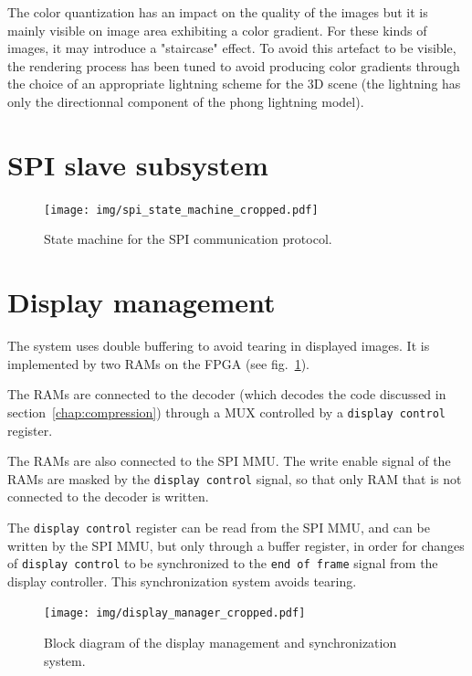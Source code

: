 \documentclass[english, DIV=13]{scrartcl}
\begin{document}
The color quantization has an impact on the quality of the images
but it is mainly visible on image area exhibiting a color gradient.
For these kinds of images,
it may introduce a "staircase" effect. To avoid this artefact to be visible,
the rendering process has been tuned to avoid producing color gradients
through the choice of an appropriate lightning scheme for the 3D scene (the lightning
has only the directionnal component of the phong lightning model).

\section{SPI slave subsystem}
\label{sec:spi}

\begin{figure}
    \centering
    \texttt{[image: img/spi\_state\_machine\_cropped.pdf]}
    \caption{State machine for the SPI communication protocol.}
\end{figure}

\section{Display management}
\label{sec:display-mngt}

The system uses double buffering to avoid tearing in displayed images.
It is implemented by two RAMs on the FPGA (see fig.~\ref{fig:display-manager}).

The RAMs are connected to the decoder
(which decodes the code discussed in section~\ref{chap:compression})
through a MUX controlled by a \texttt{display control} register.

The RAMs are also connected to the SPI MMU. The write enable
signal of the RAMs are masked by the \texttt{display control} signal,
so that only RAM that is not connected to the decoder is written.

The \texttt{display control} register can be read from the SPI MMU,
and can be written by the SPI MMU, but only through a buffer register,
in order for changes of \texttt{display control} to be synchronized
to the \texttt{end of frame} signal from the display controller.
This synchronization system avoids tearing.

\begin{figure}
    \centering
    \texttt{[image: img/display\_manager\_cropped.pdf]}
    \caption{Block diagram of the display management and synchronization system.}
    \label{fig:display-manager}
\end{figure}
\end{document}
